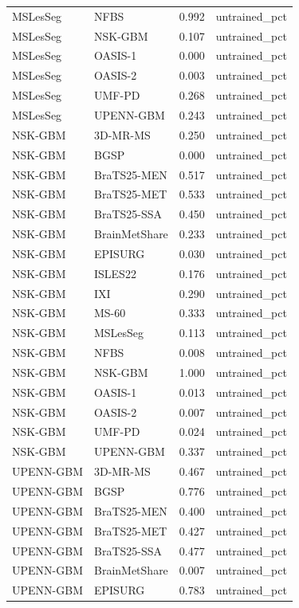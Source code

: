 \begin{tabular}{llrl}
MSLesSeg & NFBS & 0.992 & untrained\_pct \\
MSLesSeg & NSK-GBM & 0.107 & untrained\_pct \\
MSLesSeg & OASIS-1 & 0.000 & untrained\_pct \\
MSLesSeg & OASIS-2 & 0.003 & untrained\_pct \\
MSLesSeg & UMF-PD & 0.268 & untrained\_pct \\
MSLesSeg & UPENN-GBM & 0.243 & untrained\_pct \\
NSK-GBM & 3D-MR-MS & 0.250 & untrained\_pct \\
NSK-GBM & BGSP & 0.000 & untrained\_pct \\
NSK-GBM & BraTS25-MEN & 0.517 & untrained\_pct \\
NSK-GBM & BraTS25-MET & 0.533 & untrained\_pct \\
NSK-GBM & BraTS25-SSA & 0.450 & untrained\_pct \\
NSK-GBM & BrainMetShare & 0.233 & untrained\_pct \\
NSK-GBM & EPISURG & 0.030 & untrained\_pct \\
NSK-GBM & ISLES22 & 0.176 & untrained\_pct \\
NSK-GBM & IXI & 0.290 & untrained\_pct \\
NSK-GBM & MS-60 & 0.333 & untrained\_pct \\
NSK-GBM & MSLesSeg & 0.113 & untrained\_pct \\
NSK-GBM & NFBS & 0.008 & untrained\_pct \\
NSK-GBM & NSK-GBM & 1.000 & untrained\_pct \\
NSK-GBM & OASIS-1 & 0.013 & untrained\_pct \\
NSK-GBM & OASIS-2 & 0.007 & untrained\_pct \\
NSK-GBM & UMF-PD & 0.024 & untrained\_pct \\
NSK-GBM & UPENN-GBM & 0.337 & untrained\_pct \\
UPENN-GBM & 3D-MR-MS & 0.467 & untrained\_pct \\
UPENN-GBM & BGSP & 0.776 & untrained\_pct \\
UPENN-GBM & BraTS25-MEN & 0.400 & untrained\_pct \\
UPENN-GBM & BraTS25-MET & 0.427 & untrained\_pct \\
UPENN-GBM & BraTS25-SSA & 0.477 & untrained\_pct \\
UPENN-GBM & BrainMetShare & 0.007 & untrained\_pct \\
UPENN-GBM & EPISURG & 0.783 & untrained\_pct \\

\end{tabular}
